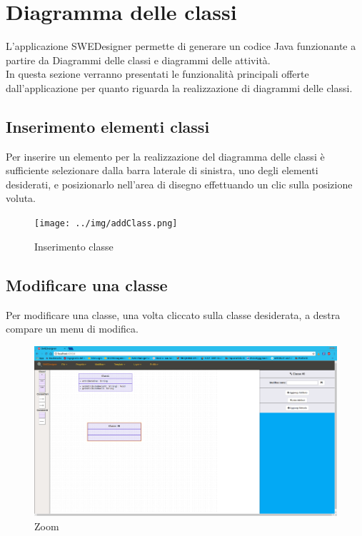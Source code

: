 \section{Diagramma delle classi}
L'applicazione SWEDesigner permette di generare un codice Java funzionante a partire da Diagrammi delle classi e diagrammi delle attività.\\
In questa sezione verranno presentati le funzionalità principali offerte dall'applicazione per quanto riguarda la realizzazione di diagrammi delle classi.

\subsection{Inserimento elementi classi}
Per inserire un elemento per la realizzazione del diagramma delle classi è sufficiente selezionare dalla barra laterale di sinistra, uno degli elementi desiderati, e posizionarlo nell'area di disegno effettuando un clic sulla posizione voluta.
\begin{figure}[h!]
	\centering
		\texttt{[image: ../img/addClass.png]}
	\caption{Inserimento classe}
\end{figure}
\newpage

\subsection{Modificare una classe}
Per modificare una classe, una volta cliccato sulla classe desiderata, a destra compare un menu di modifica.
\begin{figure}[h!]
	\centering
		\includegraphics[scale=1]{../img/editClass.png}
	\caption{Zoom}
\end{figure}
\newpage

